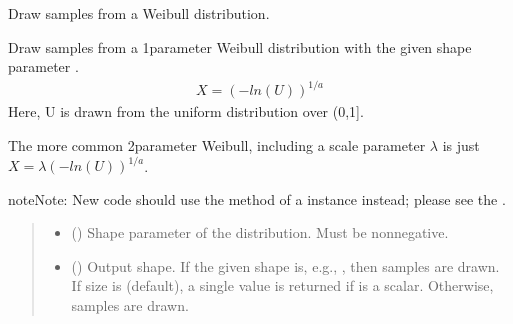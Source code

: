 \documentclass[letterpaper,10pt,english]{sphinxmanual}
\begin{document}
\begin{fulllineitems}
\label{\detokenize{metilda.controllers:metilda.controllers.pitch_art_wizard.weibull}}
\pysigstartsignatures
{}
\pysigstopsignatures
\sphinxAtStartPar
Draw samples from a Weibull distribution.

\sphinxAtStartPar
Draw samples from a 1\sphinxhyphen{}parameter Weibull distribution with the given
shape parameter .
\begin{equation*}
\begin{split}X = (-ln(U))^{1/a}\end{split}
\end{equation*}
\sphinxAtStartPar
Here, U is drawn from the uniform distribution over (0,1{]}.

\sphinxAtStartPar
The more common 2\sphinxhyphen{}parameter Weibull, including a scale parameter
\(\lambda\) is just \(X = \lambda(-ln(U))^{1/a}\).

\begin{sphinxadmonition}{note}{Note:}
\sphinxAtStartPar
New code should use the 
method of a  instance instead;
please see the .
\end{sphinxadmonition}
\begin{quote}\begin{description}
\begin{itemize}
\item {} 
\sphinxAtStartPar
{} () \textendash{} Shape parameter of the distribution.  Must be nonnegative.

\item {} 
\sphinxAtStartPar
{} (\sphinxstyleliteralemphasis{\sphinxupquote{, }}) \textendash{} Output shape.  If the given shape is, e.g., , then
 samples are drawn.  If size is  (default),
a single value is returned if  is a scalar.  Otherwise,
 samples are drawn.


\end{itemize}
\end{description}
\end{quote}
\end{fulllineitems}
\end{document}
